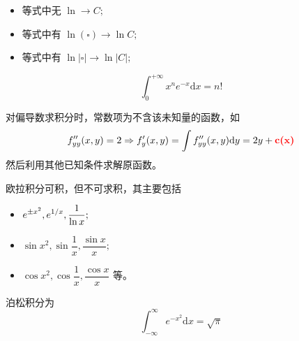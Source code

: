 \begin{Appendices}

\begin{itemize}
    \item 等式中无 $ \ln \rightarrow C;  $ 
    \item 等式中有 $ \ln (\square) \rightarrow \ln C; $ 
    \item 等式中有 $ \ln |\square| \rightarrow \ln |C|; $ 
\end{itemize}


$$
    \int_0^{+\infty} x^n e^{-x}\mathrm{d}x = n!
$$ 


对偏导数求积分时，常数项为不含该未知量的函数，如
\begin{equation*}
    \begin{aligned}
        f^{\prime\prime}_{yy}(x,y) = 2 \Rightarrow
        f'_y(x,y) = \int f^{\prime\prime}_{yy}(x,y) \mathrm{d}y
        = 2y + \textcolor{red}{\textbf{c(x)}}
    \end{aligned}
\end{equation*}
然后利用其他已知条件求解原函数。


欧拉积分可积，但不可求积，其主要包括
\begin{itemize}
    \item $ \displaystyle e^{\pm x^2},e^{1/x},\dfrac{1}{\ln x}; $ 
    \item $ \sin x^2,\sin \dfrac{1}{x}, \dfrac{\sin x}{x}; $ 
    \item $ \cos x^2,\cos \dfrac{1}{x}, \dfrac{\cos x}{x} $ 等。
\end{itemize}

泊松积分为
$$
    \int_{-\infty}^\infty e^{-x^2}\mathrm{d}x = \sqrt{\pi}    
$$ 



\end{Appendices}